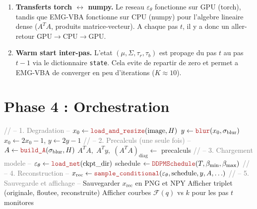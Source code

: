 \documentclass[12pt]{article}
\newcommand{\R}{\mathbb{R}}
\newcommand{\file}[1]{\texttt{\color{codeblue}#1}}
\newcommand{\func}[1]{\texttt{\color{codered}#1}}
\newcommand{\var}[1]{\texttt{\color{codegreen}#1}}
\begin{document}
\begin{remarkbox}
\begin{enumerate}[nosep]
  \item \textbf{Transferts torch $\leftrightarrow$ numpy.} Le reseau $\varepsilon_\theta$ fonctionne sur GPU (torch), tandis que EMG-VBA fonctionne sur CPU (numpy) pour l'algebre lineaire dense ($A^TA$, produits matrice-vecteur). A chaque pas $t$, il y a donc un aller-retour GPU$\to$CPU$\to$GPU.
  \item \textbf{Warm start inter-pas.} L'etat $(\mu, \Sigma, \tau_r, \tau_b)$ est propage du pas $t$ au pas $t-1$ via le dictionnaire \var{state}. Cela evite de repartir de zero et permet a EMG-VBA de converger en peu d'iterations ($K \approx 10$).
\end{enumerate}
\end{remarkbox}

\section{Phase 4 : Orchestration}

\begin{algorithm}[H]
\caption{Pipeline complete --- \file{main.py} $\to$ \func{main}}
\begin{algorithmic}[1]
\State \textcolor{gray}{// -- 1. Degradation --}
\State $x_0 \gets \func{load\_and\_resize}(\text{image}, H)$ \Comment{$[0,1]$}
\State $y \gets \func{blur}(x_0, \sigma_{\text{blur}})$ \Comment{$[0,1]$}
\State $x_0 \gets 2x_0 - 1$, \quad $y \gets 2y - 1$ \Comment{$\to [-1,1]$}
\State
\State \textcolor{gray}{// -- 2. Precalculs (une seule fois) --}
\State $A \gets \func{build\_A}(\sigma_{\text{blur}}, H)$ \Comment{$\R^{n \times n}$}
\State $A^TA,\; A^Ty,\; (A^TA)_{\text{diag}} \gets$ precalculs \Comment{\S\ref{sec:precalculs}}
\State
\State \textcolor{gray}{// -- 3. Chargement modele --}
\State $\varepsilon_\theta \gets \func{load\_net}(\text{ckpt\_dir})$ 
\State schedule $\gets \func{DDPMSchedule}(T, \beta_{\min}, \beta_{\max})$
\State
\State \textcolor{gray}{// -- 4. Reconstruction --}
\State $x_{\text{rec}} \gets \func{sample\_conditional}(\varepsilon_\theta, \text{schedule}, y, A, \ldots)$
\State
\State \textcolor{gray}{// -- 5. Sauvegarde et affichage --}
\State Sauvegarder $x_{\text{rec}}$ en PNG et NPY
\State Afficher triplet (originale, floutee, reconstruite)
\State Afficher courbes $\mathcal{F}(q)$ vs $k$ pour les pas $t$ monitores
\end{algorithmic}
\end{algorithm}
\end{document}

